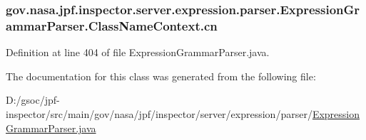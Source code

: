 \subsubsection[{\texorpdfstring{cn}{cn}}]{ gov.\+nasa.\+jpf.\+inspector.\+server.\+expression.\+parser.\+Expression\+Grammar\+Parser.\+Class\+Name\+Context.\+cn}\hypertarget{classgov_1_1nasa_1_1jpf_1_1inspector_1_1server_1_1expression_1_1parser_1_1_expression_grammar_parser_1_1_class_name_context_adfd3eff7fa59de106f32ddb5f19117e8}{}\label{classgov_1_1nasa_1_1jpf_1_1inspector_1_1server_1_1expression_1_1parser_1_1_expression_grammar_parser_1_1_class_name_context_adfd3eff7fa59de106f32ddb5f19117e8}


Definition at line 404 of file Expression\+Grammar\+Parser.\+java.



The documentation for this class was generated from the following file\+:\begin{DoxyCompactItemize}
\item 
D\+:/gsoc/jpf-\/inspector/src/main/gov/nasa/jpf/inspector/server/expression/parser/\hyperlink{_expression_grammar_parser_8java}{Expression\+Grammar\+Parser.\+java}\end{DoxyCompactItemize}
